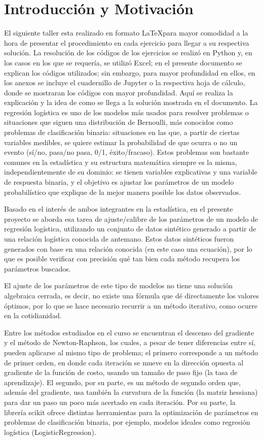 \section*{Introducción y Motivación}
El siguiente taller esta realizado en formato \LaTeX para mayor comodidad a la hora de presentar el procedimiento en cada ejercicio para llegar a su respectiva solución. La resolución de los códigos de los ejercicios se realizó en Python y, en los casos en los que se requería, se utilizó Excel; en el presente documento se explican los códigos utilizados; sin embargo, para mayor profundidad en ellos, en los anexos se incluye el cuadernillo de Jupyter \cite{Jupyter} o la respectiva hoja de cálculo, donde se mostraran los códigos con mayor profundidad. Aquí se realiza la explicación y la idea de como se llega a la solución mostrada en el documento.
La regresión logística es uno de los modelos más usados para resolver problemas o situaciones que siguen una distribución de Bernoulli, más conocidos como problemas de clasificación binaria: situaciones en las que, a partir de ciertas variables medibles, se quiere estimar la probabilidad de que ocurra o no un evento (sí/no, pasa/no pasa, 0/1, éxito/fracaso). Estos problemas son bastante comunes en la estadística y su estructura matemática siempre es la misma, independientemente de su dominio: se tienen variables explicativas y una variable de respuesta binaria, y el objetivo es ajustar los parámetros de un modelo probabilístico que explique de la mejor manera posible los datos observados.

Basado en el interés de ambos integrantes en la estadística, en el presente proyecto se aborda esa tarea de ajuste/calibre de los parámetros de un modelo de regresión logística, utilizando un conjunto de datos sintético generado a partir de una relación logística conocida de antemano. Estos datos sintéticos fueron generados con base en una relación conocida (en este caso una ecuación), por lo que es posible verificar con precisión qué tan bien cada método recupera los parámetros buscados. 

El ajuste de los parámetros de este tipo de modelos no tiene una solución algebraica cerrada, es decir, no existe una fórmula que dé directamente los valores óptimos, por lo que se hace necesario recurrir a un método iterativo, como ocurre en la cotidianidad. 

Entre los métodos estudiados en el curso se encuentran el descenso del gradiente y el método de Newton-Raphson, los cuales, a pesar de tener diferencias entre sí, pueden aplicarse al mismo tipo de problema; el primero corresponde a un método de primer orden, en donde cada iteración se mueve en la dirección opuesta al gradiente de la función de costo, usando un tamaño de paso fijo (la tasa de aprendizaje). El segundo, por su parte, es un método de segundo orden que, además del gradiente, usa también la curvatura de la función (la matriz hessiana) para dar un paso un poco más acertado en cada iteración. Por su parte, la librería scikit ofrece distintas herramientas para la optimización de parámetros en problemas de clasificación binaria, por ejemplo, modelos ideales como regresión logística (LogisticRegression).

